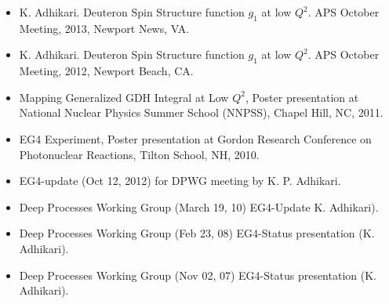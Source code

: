 \documentclass[10pt, letterpaper]{article}
\begin{document}
\begin{itemize}
\item K. Adhikari.  Deuteron Spin Structure function $g_1$ at low $Q^2$. APS October Meeting, 2013, Newport News, VA.
\item K. Adhikari.  Deuteron Spin Structure function $g_1$ at low $Q^2$. APS October Meeting, 2012, Newport Beach, CA.
\item Mapping Generalized GDH Integral at Low $Q^2$, Poster presentation at National Nuclear Physics Summer School (NNPSS), Chapel Hill, NC, 2011. %
\item EG4 Experiment, Poster presentation at Gordon Research Conference on Photonuclear Reactions, Tilton School, NH, 2010. %

\item EG4-update (Oct 12, 2012) for DPWG meeting by K. P. Adhikari.
\item Deep Processes Working Group (March 19, 10) EG4-Update K. Adhikari).
\item Deep Processes Working Group (Feb 23, 08) EG4-Status presentation (K. Adhikari).
\item Deep Processes Working Group (Nov 02, 07) EG4-Status presentation (K. Adhikari).


\end{itemize}
\end{document}
